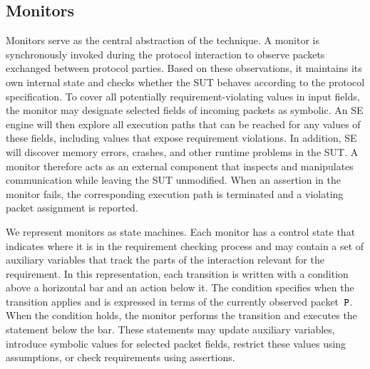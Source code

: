 \subsection{Monitors}
Monitors serve as the central abstraction of the technique.
A monitor is synchronously invoked during the protocol interaction to observe packets exchanged between protocol parties.
Based on these observations, it maintains its own internal state and checks whether the SUT behaves according to the protocol specification.
To cover all potentially requirement-violating values in input fields, the monitor may designate selected fields of incoming packets as symbolic.
An SE engine will then explore all execution paths that can be reached for any values of these fields, including values that expose requirement violations.
In addition, SE will discover memory errors, crashes, and other runtime problems in the SUT.
A monitor therefore acts as an external component that inspects and manipulates communication while leaving the SUT unmodified.
When an assertion in the monitor fails, the corresponding execution path is terminated and a violating packet assignment is reported.

We represent monitors as state machines.
Each monitor has a control state that indicates where it is in the requirement checking process and may contain a set of auxiliary variables that track the parts of the interaction relevant for the requirement.
In this representation, each transition is written with a condition above a horizontal bar and an action below it.
The condition specifies when the transition applies and is expressed in terms of the currently observed packet~$\texttt{P}$.
When the condition holds, the monitor performs the transition and executes the statement below the bar.
These statements may update auxiliary variables, introduce symbolic values for selected packet fields, restrict these values using assumptions, or check requirements using assertions.

